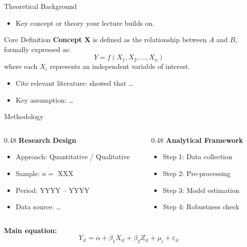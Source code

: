 \documentclass[t]{beamer}
\newcommand{\highlightbox}[1]{%
    \begin{block}{}
        \RaggedRight #1
    \end{block}
}
\newcommand{\findingbox}[2]{%
    \begin{block}{#1}
        \RaggedRight #2
    \end{block}
}
\begin{document}
\begin{frame}{Theoretical Background}
    \begin{itemize}
        \item Key concept or theory your lecture builds on.
    \end{itemize}

    \vspace{0.3cm}
    \findingbox{Core Definition}{%
        \textbf{Concept X} is defined as the relationship between $A$ and $B$,
        formally expressed as:
        \[
            Y = f(X_1, X_2, \ldots, X_n)
        \]
        where each $X_i$ represents an independent variable of interest.
    }

    \vspace{0.2cm}
    \begin{itemize}
        \item Cite relevant literature: \citet{author2020} showed that \ldots
        \item Key assumption: \ldots
    \end{itemize}
\end{frame}

\begin{frame}{Methodology}
    \begin{columns}[T]
        \begin{column}{0.48\textwidth}
            \textbf{Research Design}
            \begin{itemize}
                \item Approach: Quantitative / Qualitative
                \item Sample: $n = $ XXX
                \item Period: YYYY -- YYYY
                \item Data source: \ldots
            \end{itemize}
        \end{column}
        \begin{column}{0.48\textwidth}
            \textbf{Analytical Framework}
            \begin{itemize}
                \item Step 1: Data collection
                \item Step 2: Pre-processing
                \item Step 3: Model estimation
                \item Step 4: Robustness check
            \end{itemize}
        \end{column}
    \end{columns}

    \vspace{0.4cm}
    \highlightbox{%
        \textbf{Main equation:}
        \[
            Y_{it} = \alpha + \beta_1 X_{it} + \beta_2 Z_{it} + \mu_i + \varepsilon_{it}
        \]
    }
\end{frame}
\end{document}
